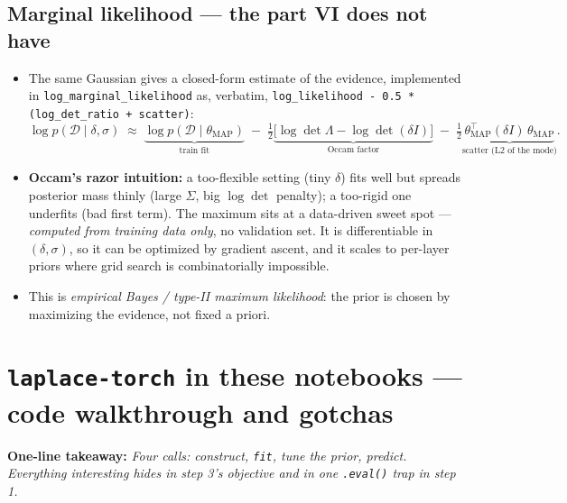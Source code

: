 \documentclass[10pt,a4paper]{article}
\newcommand{\code}[1]{\texttt{#1}}
\newcommand{\map}{\mathrm{MAP}}
\newcommand{\takeaway}[1]{\textbf{One-line takeaway:} \emph{#1}}
\begin{document}
\subsection{Marginal likelihood --- the part VI does not have}
\begin{itemize}
\item The same Gaussian gives a closed-form estimate of the evidence, implemented in
  \code{log\_marginal\_likelihood} as, verbatim, \code{log\_likelihood - 0.5 * (log\_det\_ratio +
  scatter)}:
  \[
  \log p(\mathcal{D}\mid\delta,\sigma)\;\approx\;
  \underbrace{\log p(\mathcal{D}\mid\theta_\map)}_{\text{train fit}}
  \;-\;\tfrac12\underbrace{\bigl[\log\det\Lambda-\log\det(\delta I)\bigr]}_{\text{Occam factor}}
  \;-\;\tfrac12\underbrace{\theta_\map^\top(\delta I)\,\theta_\map}_{\text{scatter (L2 of the mode)}} .
  \]
\item \textbf{Occam's razor intuition:} a too-flexible setting (tiny $\delta$) fits well but
  spreads posterior mass thinly (large $\Sigma$, big $\log\det$ penalty); a too-rigid one underfits
  (bad first term). The maximum sits at a data-driven sweet spot --- \emph{computed from training
  data only}, no validation set. It is differentiable in $(\delta,\sigma)$, so it can be optimized
  by gradient ascent, and it scales to per-layer priors where grid search is combinatorially
  impossible.
\item This is \emph{empirical Bayes / type-II maximum likelihood}: the prior is chosen by
  maximizing the evidence, not fixed a priori.
\end{itemize}

\section{\code{laplace-torch} in these notebooks --- code walkthrough and gotchas}\label{sec:lacode}
\takeaway{Four calls: construct, \code{fit}, tune the prior, predict. Everything interesting hides
in step 3's objective and in one \code{.eval()} trap in step 1.}
\end{document}
